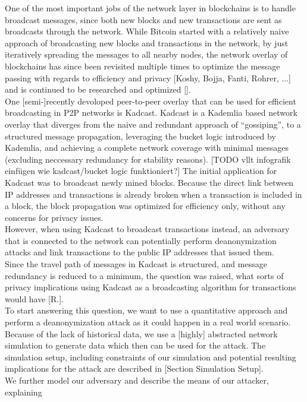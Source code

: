 One of the most important jobs of the network layer in blockchains is to handle broadcast messages, since
both new blocks and new transactions are sent as broadcasts through the network.
While Bitcoin started with a relatively naive approach of broadcasting
new blocks and transactions in the network, by just iteratively spreading the
messages to all nearby nodes,
the network overlay of blockchains has since been revisited multiple times to optimize the message passing with regards to efficiency and privacy [Koshy, Bojja, Fanti, Rohrer, ...] and is continued to be researched and optimized []. \\
One [semi-]recently devoloped peer-to-peer overlay that can be used for efficient broadcasting in P2P networks is Kadcast.
Kadcast is a Kademlia based network overlay that diverges from the naive and redundant approach of ``gossiping'', to a structured message propagation, leveraging the bucket logic introduced by Kademlia, and achieving a complete network coverage with minimal messages (excluding neccessary redundancy for stability reasons). [TODO vllt infografik einfügen wie kadcast/bucket logic funktioniert?]
The initial application for Kadcast was to broadcast newly mined blocks.
Because the direct link between IP addresses and transactions is already
broken when a transaction is included in a block, the block propagation
was optimized for efficiency only, without any concerns for privacy issues. \\
However, when using Kadcast to broadcast transactions instead, an adversary that is connected to the network can potentially perform
deanonymization attacks and link transactions to the public IP addresses that issued them. \\
Since the travel path of messages in Kadcast is structured, and message redundancy is reduced to a minimum, the question was raised, what sorts of privacy implications using Kadcast as a broadcasting algorithm for transactions would have [R.]. \\
To start answering this question, we want to use a quantitative approach and perform a deanonymization attack
as it could happen in a real world scenario. Because of the lack of historical data, we use a [highly] abstracted network
simulation to generate data which then can be used for the attack. The simulation setup, including constraints of our simulation and potential resulting implications for the attack are described in [Section Simulation Setup]. \\
We further model our adversary and describe the means of our attacker, explaining
